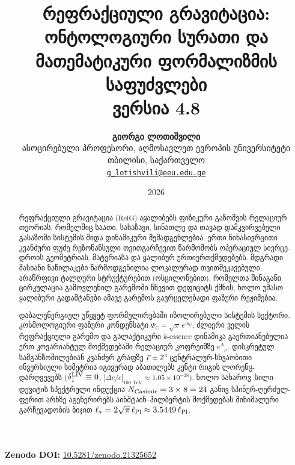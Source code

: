\documentclass[11pt,a4paper]{article}
\title{\textbf{რეფრაქციული გრავიტაცია: ონტოლოგიური სურათი და მათემატიკური ფორმალიზმის საფუძვლები}\\[0.5em]\large ვერსია 4.8}
\author{\textbf{გიორგი ლოთიშვილი}\\
\small ასოცირებული პროფესორი, აღმოსავლეთ ევროპის უნივერსიტეტი\\
\small თბილისი, საქართველო\\
\small \href{mailto:g_lotishvili@eeu.edu.ge}{\texttt{g\_lotishvili@eeu.edu.ge}}}
\date{2026}
\newcommand{\RefG}{\mathrm{RefG}}
\begin{document}
\maketitle

\begin{center}
\textbf{Zenodo DOI:} \href{https://doi.org/10.5281/zenodo.21325652}{10.5281/zenodo.21325652}
\end{center}

\begin{abstract}
რეფრაქციული გრავიტაცია ($\RefG$) აყალიბებს ფიზიკური გაზომვის რელაციურ თეორიას, რომელშიც საათი, სახაზავი, სინათლე და თავად დამკვირვებელი გასაზომი სისტემის შიდა დინამიკური შემადგენლებია. ერთი წინასივრცითი კვანძური ფუძე რეზონანსული თვითგარჩევით წარმოშობს ოპერაციულ სივრცე-დროის გეომეტრიას, მატერიასა და ყალიბურ ურთიერთქმედებებს. მდგრადი მასიანი ნაწილაკები წარმოდგენილია ლოკალურად თვითშეკავებული არაწრფივი ტალღური სტრუქტურებით (ოსცილონებით), რომელთა შინაგანი ცირკულაცია გამოვლენილ გარემოში წნევით დეფიციტს ქმნის, ხოლო უმასო ყალიბური გადამტანები ამავე გარემოს გავრცელებადი ფაზური რეჟიმებია.

დაბალენერგიულ უწყვეტ ფორმულირებაში იზოლირებული სისტემის სექტორი, კოსმოლოგიური ფაზური კონდენსატი $\Psi_C = \sqrt{x}\,e^{i\theta_C}$, ძლიერი ველის რეფრაქციული გარემო და გალაქტიკური $k$-essence დინამიკა გაერთიანებულია ერთ კოვარიანტულ მოქმედებაში რელაციურ კოფრეიმზე $e^A{}_\mu$. დისკრეტულ სამგანზომილებიან კვანძურ გრაფზე $\Gamma = \mathbb{Z}^3$ ცენტრალურ-სხვაობითი ინვერსიული სიმეტრია იგივურად აბათილებს კენტი რიგის ლორენც-დარღვევებს ($\delta_1^{\rm LIV} \equiv 0$, $|\Delta c/c|_{100\text{ TeV}} \approx 1.05\times 10^{-28}$), ხოლო სახაროვ–სილი–დევიტის სპექტრული ინდუქცია $N_{\rm Casimir} = 3\times 8 = 24$ განივ სპინურ-ღერძულ-ფერით არხზე აგენერირებს აინშტაინ–ჰილბერტის მოქმედებას მინიმალური გარჩევადობის ბიჯით $\ell_* = 2\sqrt{\pi}\,\ell_{\rm Pl} \approx 3.5449\,\ell_{\rm Pl}$.


\end{abstract}
\end{document}
